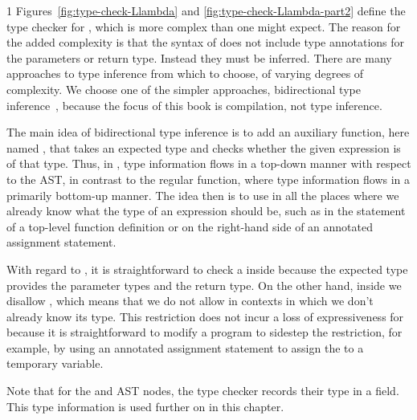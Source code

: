 \documentclass[7x10]{TimesAPriori_MIT}%
\def\pythonEd{1}
\def\edition{1}
\newcommand{\pythonColor}[0]{}
\numberwithin{theorem}{chapter}
\numberwithin{definition}{chapter}
\numberwithin{equation}{chapter}
\begin{document}
{\if\edition\pythonEd\pythonColor
%
Figures~\ref{fig:type-check-Llambda} and
\ref{fig:type-check-Llambda-part2} define the type checker for
\LangLam{}, which is more complex than one might expect. The reason
for the added complexity is that the syntax of  does not
include type annotations for the parameters or return type.  Instead
they must be inferred. There are many approaches to type inference
from which to choose, of varying degrees of complexity. We choose one
of the simpler approaches, bidirectional type
inference~\citep{Pierce:2000,Dunfield:2021}, because the focus of this
book is compilation, not type inference.

The main idea of bidirectional type inference is to add an auxiliary
function, here named , that takes an expected type
and checks whether the given expression is of that type.  Thus, in
, type information flows in a top-down manner with
respect to the AST, in contrast to the regular 
function, where type information flows in a primarily bottom-up
manner.
%
The idea then is to use  in all the places where we
already know what the type of an expression should be, such as in the
 statement of a top-level function definition or on the
right-hand side of an annotated assignment statement.

With regard to , it is straightforward to check a
 inside  because the expected type
provides the parameter types and the return type.  On the other hand,
inside  we disallow , which means
that we do not allow  in contexts in which we don't already
know its type. This restriction does not incur a loss of
expressiveness for \LangLam{} because it is straightforward to modify
a program to sidestep the restriction, for example, by using an
annotated assignment statement to assign the  to a
temporary variable.

Note that for the  and  AST nodes, the type
checker records their type in a  field. This type
information is used further on in this chapter.
%
\fi}
\end{document}
